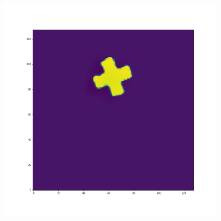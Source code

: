 \documentclass[12pt,a4paper]{article}
\begin{document}
\begin{figure}[H]
\begin{minipage}{.3\textwidth}
\end{minipage}%
\begin{minipage}{.3\textwidth}
  \centering
  \includegraphics[width=\linewidth]{Pictures/PlusRotateTestJR/PlusRotateTest_t20.png}
\end{minipage}
\end{figure}
\end{document}
